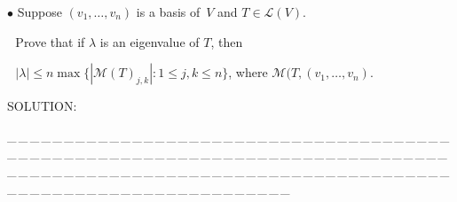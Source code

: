 \documentclass[a4paper, 11pt, UTF8]{article}
\def\Lm{\mathcal{L}}
\def\Mt{\mathcal{M}}
\begin{document}
\begin{large}
{\small $\bullet$} {\timessl\Large 
Suppose $(v_1,\dots,v_n)$ is a basis of \,$V$ and $T\in\Lm(V)$.}\par\,\,
{\timessl\Large Prove that if $\lambda$ is an eigenvalue of $T$, then}\par\,\,
{\timessl\Large $|\lambda|\leq n \max\{|\Mt(T)_{j,k}|:1\leq j, k\leq n\}$, where $\Mt(T,(v_1,\dots,v_n).$
}\par
{\timesbf S\footnotesize{OLUTION:}}\par\quad

\par
{\tiny \_\,\_\,\_\,\_\,\_\,\_\,\_\,\_\,\_\,\_\,\_\,\_\,\_\,\_\,\_\,\_\,\_\,\_\,\_\,\_\,\_\,\_\,\_\,\_\,\_\,\_\,\_\,\_\,\_\,\_\,\_\,\_\,\_\,\_\,\_\,\_\,\_\,\_\,\_\,\_\,\_\,\_\,\_\,\_\,\_\,\_\,\_\,\_\,\_\,\_\,\_\,\_\,\_\,\_\,\_\,\_\,\_\,\_\,\_\,\_\,\_\,\_\,\_\,\_\,\_\,\_\,\_\,\_\,\_\,\_\,\_\_\,\_\,\_\,\_\,\_\,\_\,\_\,\_\,\_\,\_\,\_\,\_\,\_\,\_\,\_\,\_\,\_\,\_\,\_\,\_\,\_\,\_\,\_\,\_\,\_\,\_\,\_\,\_\,\_\,\_\,\_\,\_\,\_\,\_\,\_\,\_\,\_\,\_\,\_\,\_\,\_\,\_\,\_\,\_\,\_\,\_\,\_\,\_\,\_\,\_\,\_\,\_\,\_\,\_\,\_\,\_\,\_\,\_\,\_\,\_\,\_\,\_\,\_\,\_\,\_\,\_\,\_\,\_\,\_\,\_\,\_}\par



\end{large}
\end{document}
